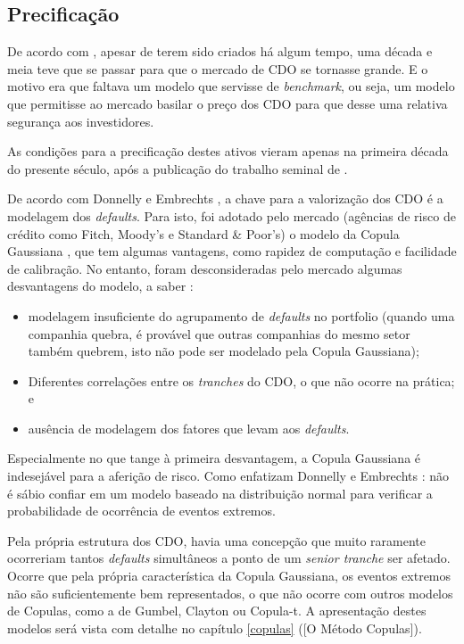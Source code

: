 \documentclass[
	12pt,				%
	oneside,			%
	a4paper,			%
	chapter=TITLE,		%
	section=TITLE,		%
	english,			%
	brazil				%
	]{abntex2}
\begin{document}
\hypertarget{precificauxe7uxe3o}{%
\subsection{Precificação}\label{precificauxe7uxe3o}}

De acordo com \textcite{watts}, apesar de terem sido criados há algum tempo, uma década e
meia teve que se passar para que o mercado de \gls{CDO} se tornasse grande. E o
motivo era que faltava um modelo que servisse de \emph{benchmark}, ou seja, um modelo
que permitisse ao mercado basilar o preço dos \gls{CDO} para que desse uma
relativa segurança aos investidores.

As condições para a precificação destes ativos vieram apenas na primeira década
do presente século, após a publicação do trabalho seminal de \textcite{Li}.

De acordo com Donnelly e Embrechts \autocite*[7]{devil}, a chave para a valorização dos
\gls{CDO} é a modelagem dos \emph{defaults}. Para isto, foi adotado pelo mercado
(agências de risco de crédito como Fitch, Moody's e Standard \& Poor's) o modelo
da Copula Gaussiana \autocite[14]{devil}, que tem algumas vantagens, como rapidez de
computação e facilidade de calibração. No entanto, foram desconsideradas pelo
mercado algumas desvantagens do modelo, a saber \autocite[15]{devil}:
\begin{itemize}
\tightlist
\item
  modelagem insuficiente do agrupamento de \emph{defaults} no portfolio (quando uma
  companhia quebra, é provável que outras companhias do mesmo setor também quebrem,
  isto não pode ser modelado pela Copula Gaussiana);
\item
  Diferentes correlações entre os \emph{tranches} do CDO, o que não ocorre na
  prática; e
\item
  ausência de modelagem dos fatores que levam aos \emph{defaults}.
\end{itemize}
Especialmente no que tange à primeira desvantagem, a Copula Gaussiana é
indesejável para a aferição de risco. Como enfatizam Donnelly e Embrechts
\autocite*[16]{devil}: não é sábio confiar em um modelo baseado na distribuição normal
para verificar a probabilidade de ocorrência de eventos extremos.

Pela própria estrutura dos \gls{CDO}, havia uma concepção que muito raramente
ocorreriam tantos \emph{defaults} simultâneos a ponto de um \emph{senior tranche} ser
afetado. Ocorre que pela própria característica da Copula Gaussiana, os eventos
extremos não são suficientemente bem representados, o que não ocorre com outros
modelos de Copulas, como a de Gumbel, Clayton ou Copula-t. A apresentação
destes modelos será vista com detalhe no capítulo \ref{copulas} ({[}O Método
Copulas{]}).
\end{document}
